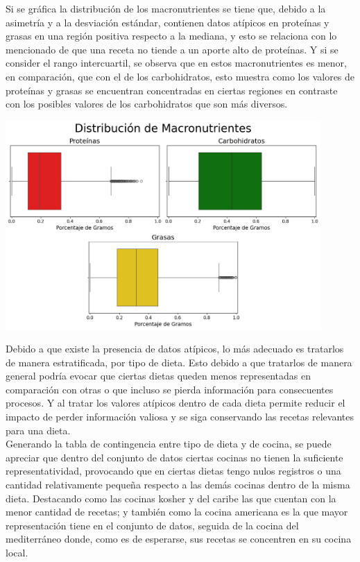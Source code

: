 \documentclass[12pt,a4paper]{article}
\begin{document}
        Si se gráfica la distribución de los macronutrientes se tiene que, debido 
        a la asimetría y a la desviación estándar, contienen datos atípicos en proteínas y grasas en una región 
        positiva respecto a la mediana, y esto se relaciona con lo mencionado de que 
        una receta no tiende a un aporte alto de proteínas. Y si se consider el rango 
        intercuartil, se observa que en estos macronutrientes es menor, en comparación, 
        que con el de los carbohidratos, esto muestra como los valores de proteínas y 
        grasas se encuentran concentradas en ciertas regiones en contraste con los posibles 
        valores de los carbohidratos que son más diversos.
        
        \begin{center}
            \includegraphics[width=0.90\textwidth]{Resources/2_02_plot_01.png}
        \end{center}

        Debido a que existe la presencia de datos atípicos, lo más adecuado es tratarlos 
        de manera estratificada, por tipo de dieta. Esto debido a que tratarlos de manera 
        general podría evocar que ciertas dietas queden menos representadas en comparación 
        con otras o que incluso se pierda información para consecuentes procesos. Y al 
        tratar los valores atípicos dentro de cada dieta permite reducir el impacto de 
        perder información valiosa y se siga conservando las recetas relevantes para una dieta.\\

        Generando la tabla de contingencia entre tipo de dieta y de cocina, se puede apreciar 
        que dentro del conjunto de datos ciertas cocinas no tienen la suficiente representatividad, 
        provocando que en ciertas dietas tengo nulos registros o una cantidad relativamente pequeña 
        respecto a las demás cocinas dentro de la misma dieta. Destacando como las cocinas kosher y 
        del caribe las que cuentan con la menor cantidad de recetas; y también como la cocina americana 
        es la que mayor representación tiene en el conjunto de datos, seguida de la cocina del mediterráneo 
        donde, como es de esperarse, sus recetas se concentren en su cocina local.
    
\end{document}
